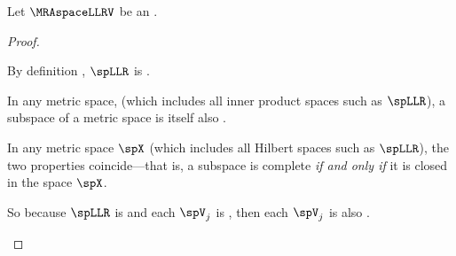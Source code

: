 \begin{proposition}
\label{prop:Vn_complete}
Let $\MRAspaceLLRV$ be an .
\end{proposition}
\begin{proof}
\begin{enume}
  \item By definition , $\spLLR$ is . 
  \item In any metric space, (which includes all inner product spaces such as $\spLLR$),
        a  subspace of a  metric space is itself also .
  \item In any  metric space $\spX$ (which includes all Hilbert spaces such as $\spLLR$), 
        the two properties coincide---that is, a subspace is complete \emph{if and only if} 
        it is closed in the space $\spX$.
  \item So because $\spLLR$ is  and each $\spV_j$ is , then each $\spV_j$ is also .
\end{enume}
\end{proof}


